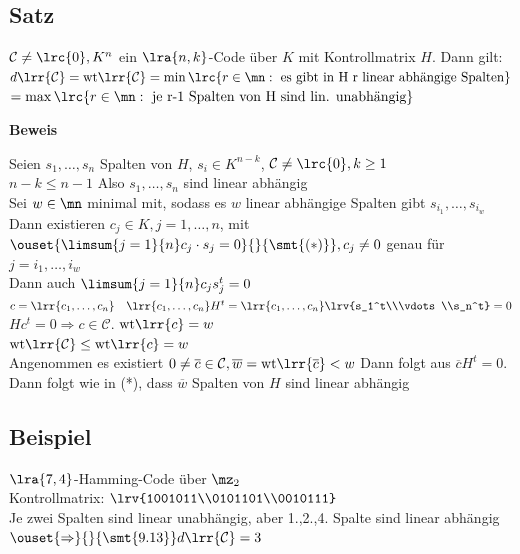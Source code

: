 	\subsection{Satz}
		$\mathcal{C}\neq\lrc{0}, K^n$ ein $\lra{n,k}$-Code über $K$ mit Kontrollmatrix $H$. Dann gilt:\\
		$d\lrr{\mathcal{C}}=\mbox{wt}\lrr{\mathcal{C}}=\min\lrc{r\in\mn:\mbox{ es gibt in H r linear abhängige Spalten}}$\\
		$=\max\lrc{r\in\mn:\mbox{ je r-1 Spalten von H sind lin. unabhängig}}$

		\textbf{Beweis}

		Seien $s_1,\dots,s_n$ Spalten von $H$, $s_i\in K^{n-k}$, $\mathcal{C}\neq\lrc{0}, k\geq 1$\\
		$n-k\leq n-1$ Also $s_1,\dots,s_n$ sind linear abhängig\\
		Sei $w\in\mn$ minimal mit, sodass es $w$ linear abhängige Spalten gibt $s_{i_1},\dots,s_{i_w}$\\
		Dann existieren $c_j\in K, j=1,\dots,n$, mit $\ouset{\limsum{j=1}{n}c_j\cdot s_j=0}{}{\smt{(*)}}, c_j\neq 0$ genau für $j=i_1,\dots,i_w$\\
		Dann auch $\limsum{j=1}{n}c_js_j^t=0$\\
		$c=\lrr{c_1,\dots,c_n}\quad \lrr{c_1,\dots,c_n}H^t=\lrr{c_1,\dots,c_n}\lrv{s_1^t\\\vdots\\s_n^t}=0$\\
		$Hc^t=0\Rightarrow c\in\mathcal{C}$. $\mbox{wt}\lrr{c}=w$\\
		$\mbox{wt}\lrr{\mathcal{C}}\leq\mbox{wt}\lrr{c}=w$\\
		Angenommen es existiert $0\neq\overline{c}\in\mathcal{C}, \overline{w}=\mbox{wt}\lrr{\overline{c}}<w$ Dann folgt aus $\overline{c}H^t=0$. Dann folgt wie in (*), dass $\overline{w}$ Spalten von $H$ sind linear abhängig \lightning

	\subsection{Beispiel}
		$\lra{7,4}$-Hamming-Code über $\mz_2$\\
		Kontrollmatrix: $\lrv{1001011\\0101101\\0010111}$\\
		Je zwei Spalten sind linear unabhängig, aber 1.,2.,4. Spalte sind linear abhängig\\
		$\ouset{\Rightarrow}{}{\smt{9.13}} d\lrr{\mathcal{C}}=3$

